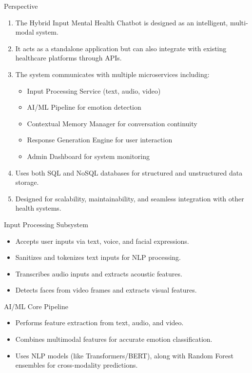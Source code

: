\documentclass[11pt]{beamer}
\begin{document}
\begin{frame}{Perspective}
    \justifying
    \begin{enumerate}
        \item The Hybrid Input Mental Health Chatbot is designed as an intelligent, multi-modal system.
        \item It acts as a standalone application but can also integrate with existing healthcare platforms through APIs.
        \item The system communicates with multiple microservices including:
        \begin{itemize}
            \item Input Processing Service (text, audio, video)
            \item AI/ML Pipeline for emotion detection
            \item Contextual Memory Manager for conversation continuity
            \item Response Generation Engine for user interaction
            \item Admin Dashboard for system monitoring
        \end{itemize}
        \item Uses both SQL and NoSQL databases for structured and unstructured data storage.
        \item Designed for scalability, maintainability, and seamless integration with other health systems.
    \end{enumerate}
\end{frame}

\begin{frame}{Input Processing Subsystem}
\begin{itemize}
    \item Accepts user inputs via text, voice, and facial expressions.
    \item Sanitizes and tokenizes text inputs for NLP processing.
    \item Transcribes audio inputs and extracts acoustic features.
    \item Detects faces from video frames and extracts visual features.
\end{itemize}
\end{frame}

\begin{frame}{AI/ML Core Pipeline}
\begin{itemize}
    \item Performs feature extraction from text, audio, and video.
    \item Combines multimodal features for accurate emotion classification.
    \item Uses NLP models (like Transformers/BERT), along with Random Forest ensembles for cross-modality predictions.
\end{itemize}
\end{frame}
\end{document}
